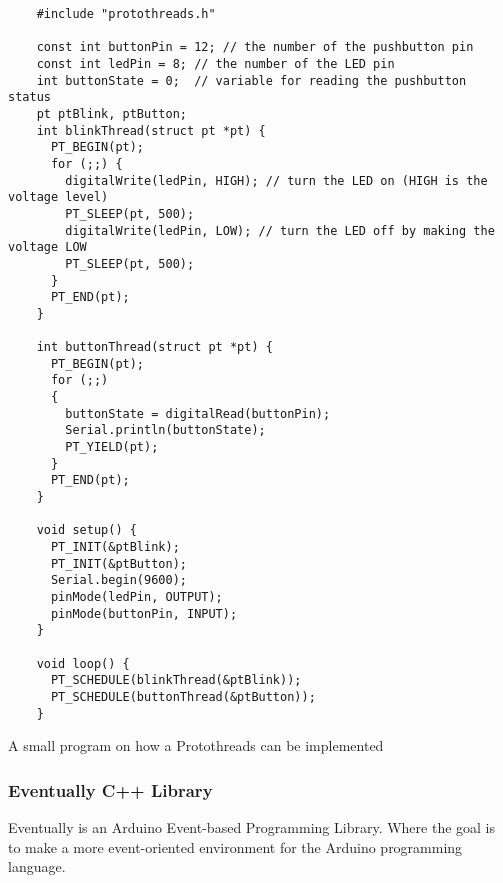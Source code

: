 \begin{listing}[htb!]
  \centering
  \begin{verbatim}
    #include "protothreads.h"

    const int buttonPin = 12; // the number of the pushbutton pin
    const int ledPin = 8; // the number of the LED pin
    int buttonState = 0;  // variable for reading the pushbutton status
    pt ptBlink, ptButton;
    int blinkThread(struct pt *pt) {
      PT_BEGIN(pt);
      for (;;) {
        digitalWrite(ledPin, HIGH); // turn the LED on (HIGH is the voltage level)
        PT_SLEEP(pt, 500);
        digitalWrite(ledPin, LOW); // turn the LED off by making the voltage LOW
        PT_SLEEP(pt, 500);
      }
      PT_END(pt);
    }

    int buttonThread(struct pt *pt) {
      PT_BEGIN(pt);
      for (;;)
      {
        buttonState = digitalRead(buttonPin);
        Serial.println(buttonState);
        PT_YIELD(pt);
      }
      PT_END(pt);
    }

    void setup() {
      PT_INIT(&ptBlink);
      PT_INIT(&ptButton);
      Serial.begin(9600);
      pinMode(ledPin, OUTPUT);
      pinMode(buttonPin, INPUT);
    }

    void loop() {
      PT_SCHEDULE(blinkThread(&ptBlink));
      PT_SCHEDULE(buttonThread(&ptButton));
    }
  \end{verbatim}
  \caption{A small program on how a Protothreads can be implemented}
  \label{List: Protothreads example}
\end{listing}

\cleardoublepage




\subsubsection{Eventually C++ Library}
Eventually is an Arduino Event-based Programming Library. Where the goal is to make a more event-oriented environment for the Arduino programming language.

